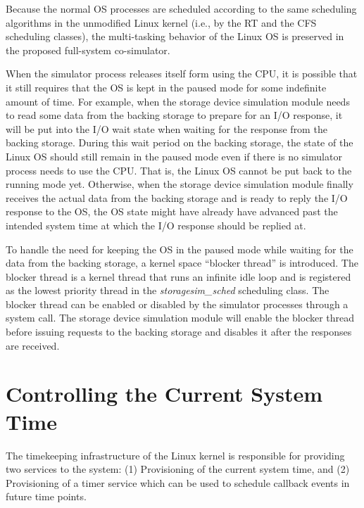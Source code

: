 Because the normal OS processes are scheduled according to the same scheduling algorithms in the unmodified Linux kernel (i.e., by the RT and the CFS scheduling classes), the multi-tasking behavior of the Linux OS is preserved in the proposed full-system co-simulator.

When the simulator process releases itself form using the CPU, it is possible that it still requires that the OS is kept in the paused mode for some indefinite amount of time. For example, when the storage device simulation module needs to read some data from the backing storage to prepare for an I/O response, it will be put into the I/O wait state when waiting for the response from the backing storage. During this wait period on the backing storage, the state of the Linux OS should still remain in the paused mode even if there is no simulator process needs to use the CPU. That is, the Linux OS cannot be put back to the running mode yet. Otherwise, when the storage device simulation module finally receives the actual data from the backing storage and is ready to reply the I/O response to the OS, the OS state might have already have advanced past the intended system time at which the I/O response should be replied at.

To handle the need for keeping the OS in the paused mode while waiting for the data from the backing storage, a kernel space ``blocker thread'' is introduced. The blocker thread is a kernel thread that runs an infinite idle loop and is registered as the lowest priority thread in the \textit{storagesim_sched} scheduling class. The blocker thread can be enabled or disabled by the simulator processes through a system call. The storage device simulation module will enable the blocker thread before issuing requests to the backing storage and disables it after the responses are received.

\section{Controlling the Current System Time}
\label{sec:controlling-current-system-time}

The timekeeping infrastructure of the Linux kernel is responsible for providing two services to the system: (1) Provisioning of the current system time, and (2) Provisioning of a timer service which can be used to schedule callback events in future time points.

